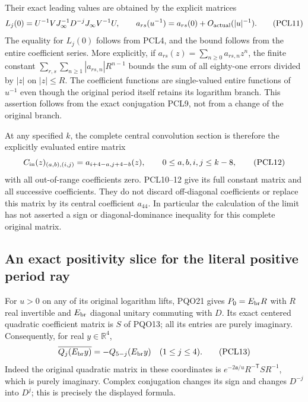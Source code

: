 Their exact leading values are obtained by the explicit matrices
\[
 L_j(0)=U^{-1}VJ_\infty^{-1}D^{-j}J_\infty V^{-1}U,
 \qquad a_{rs}(u^{-1})=a_{rs}(0)+O_{\rm actual}(|u|^{-1}).
 \tag{PCL11}
\]
The equality for $L_j(0)$ follows from PCL4, and the bound follows
from the entire coefficient series. More explicitly, if
$a_{rs}(z)=\sum_{n\ge0}a_{rs,n}z^n$, the finite constant
$\sum_{r,s}\sum_{n\ge1}|a_{rs,n}|R^{n-1}$ bounds the sum of
all eighty-one errors divided by $|z|$ on $|z|\le R$.
The coefficient functions are single-valued entire functions of
$u^{-1}$ even though the original period itself retains its
logarithm branch. This assertion follows from the exact conjugation
PCL9, not from a change of the original branch.

At any specified $k$, the complete central convolution section is
therefore the explicitly evaluated entire matrix
\[
 C_{\rm in}(z)_{(a,b),(i,j)}=a_{i+4-a,j+4-b}(z),
 \qquad 0\le a,b,i,j\le k-8,
 \tag{PCL12}
\]
with all out-of-range coefficients zero. PCL10--12 give its full
constant matrix and all successive coefficients. They do not
discard off-diagonal coefficients or replace this matrix by its
central coefficient $a_{44}$. In particular the calculation of
the limit has not asserted a sign or diagonal-dominance inequality
for this complete original matrix.

\subsection{An exact positivity slice for the literal positive period ray}
For $u>0$ on any of its original logarithm lifts, PQO21 gives
$P_0=E_{\rm br}R$ with $R$ real invertible and $E_{\rm br}$ diagonal
unitary commuting with $D$. Its exact centered quadratic coefficient
matrix is $S$ of PQO13; all its entries are purely imaginary.
Consequently, for real $y\in\mathbb R^4$,
\[
 \overline{Q_j(E_{\rm br}y)}=-Q_{5-j}(E_{\rm br}y)
              \quad(1\le j\le4).
 \tag{PCL13}
\]
Indeed the original quadratic matrix in these coordinates is
$e^{-2\mathfrak a/u}R^{-\mathsf T}SR^{-1}$, which is purely
imaginary. Complex conjugation changes its sign and changes
$D^{-j}$ into $D^j$; this is precisely the displayed formula.

